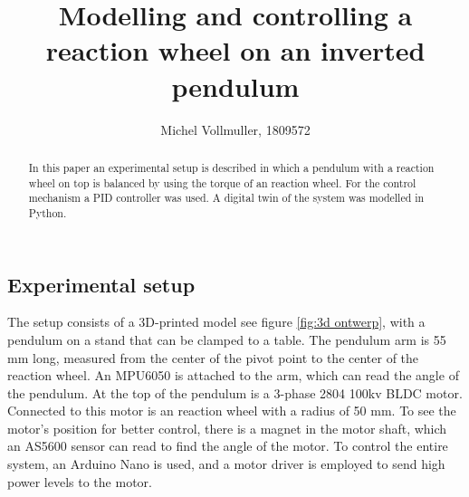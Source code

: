 \documentclass{article}
\title{Modelling and controlling a reaction wheel on an inverted pendulum}
\author{Michel Vollmuller, 1809572}
\begin{document}
\maketitle

\begin{abstract}

In this paper an experimental setup is described in which a pendulum with a reaction wheel on top is balanced by using the torque of an reaction wheel. For the control mechanism a PID controller was used. A digital twin of the system was modelled in Python.\end{abstract}

\begin{multicols}{2}

\section{Experimental setup}

The setup consists of a 3D-printed model see figure \ref{fig:3d ontwerp}, with a pendulum on a stand that can be clamped to a table. The pendulum arm is 55 mm long, measured from the center of the pivot point to the center of the reaction wheel. An MPU6050 is attached to the arm, which can read the angle of the pendulum. At the top of the pendulum is a 3-phase 2804 100kv BLDC motor. Connected to this motor is an reaction wheel with a radius of 50 mm. To see the motor's position for better control, there is a magnet in the motor shaft, which an AS5600 sensor can read to find the angle of the motor.
To control the entire system, an Arduino Nano is used, and a motor driver is employed to send high power levels to the motor.


\end{multicols}
\end{document}

